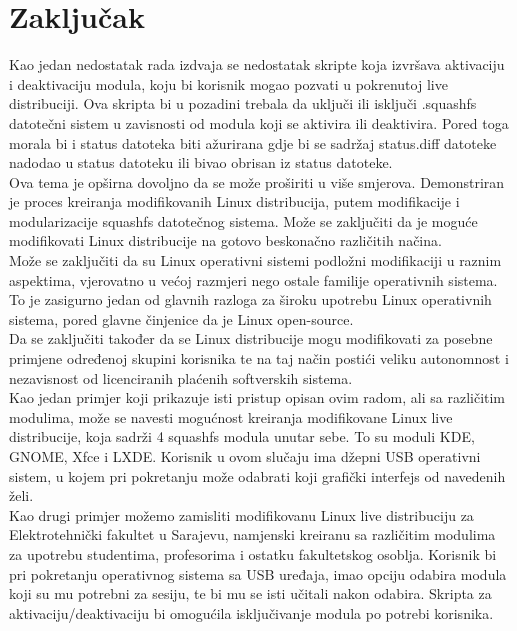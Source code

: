 \documentclass[12pt,vi]{mitthesis}
\begin{document}
\chapter*{Zaključak}
\indent
Kao jedan nedostatak rada izdvaja se nedostatak skripte koja izvršava aktivaciju i deaktivaciju modula, koju bi korisnik mogao pozvati u pokrenutoj live distribuciji. Ova skripta bi u pozadini trebala da uključi ili isključi .squashfs datotečni sistem u zavisnosti od modula koji se aktivira ili deaktivira. Pored toga morala bi i status datoteka biti ažurirana gdje bi se sadržaj status.diff datoteke nadodao u status datoteku ili bivao obrisan iz status datoteke.\\
Ova tema je opširna dovoljno da se može proširiti u više smjerova. Demonstriran je proces kreiranja modifikovanih Linux distribucija, putem modifikacije i modularizacije squashfs datotečnog sistema. Može se zaključiti da je moguće modifikovati Linux distribucije na gotovo beskonačno različitih načina.\\
Može se zaključiti da su Linux operativni sistemi podložni modifikaciji u raznim aspektima, vjerovatno u većoj razmjeri nego ostale familije operativnih sistema. To je zasigurno jedan od glavnih razloga za široku upotrebu Linux operativnih sistema, pored glavne činjenice da je Linux open-source.\\
Da se zaključiti također da se Linux distribucije mogu modifikovati za posebne primjene određenoj skupini korisnika te na taj način postići veliku autonomnost i nezavisnost od licenciranih plaćenih softverskih sistema.\\
Kao jedan primjer koji prikazuje isti pristup opisan ovim radom, ali sa različitim modulima, može se navesti mogućnost kreiranja modifikovane Linux live distribucije, koja sadrži 4 squashfs modula unutar sebe. To su moduli KDE, GNOME, Xfce i LXDE. Korisnik u ovom slučaju ima džepni USB operativni sistem, u kojem pri pokretanju može odabrati koji grafički interfejs od navedenih želi.\\
Kao drugi primjer možemo zamisliti modifikovanu Linux live distribuciju za Elektrotehnički fakultet u Sarajevu, namjenski kreiranu sa različitim modulima za upotrebu studentima, profesorima i ostatku fakultetskog osoblja. Korisnik bi pri pokretanju operativnog sistema sa USB uređaja, imao opciju odabira modula koji su mu potrebni za sesiju, te bi mu se isti učitali nakon odabira. Skripta za aktivaciju/deaktivaciju bi omogućila isključivanje modula po potrebi korisnika.\\
\end{document}

